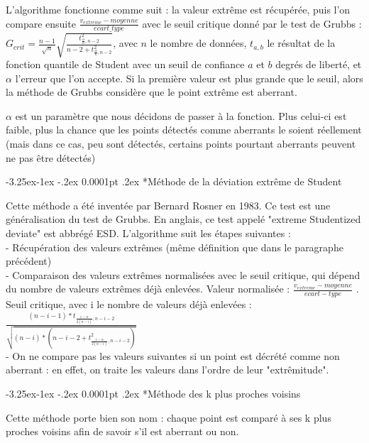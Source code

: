 \documentclass[a4paper,12pt]{article} %
\makeatletter
\renewcommand\subparagraph{\@startsection{subparagraph}{5}{\z@}%
                                      {-3.25ex\@plus -1ex \@minus -.2ex}%
                                      {0.0001pt \@plus .2ex}%
                                      {\normalfont\normalsize\bfseries}}
\makeatother
\begin{document}
                        L'algorithme fonctionne comme suit : la valeur extrême est récupérée, puis l'on compare ensuite $\frac{v_{extreme}-moyenne}{ecart\_type}$ avec le seuil critique donné par le test de Grubbs : $G_{crit} = \frac{n-1}{\sqrt{n}}\sqrt{\frac{t^2_{\frac{\alpha}{n},n-2}}{n-2+t^2_{\frac{\alpha}{n},n-2}}}$, avec $n$ le nombre de données, $t_{a,b}$ le résultat de la fonction quantile de Student avec un seuil de conﬁance $a$ et $b$ degrés de liberté, et $\alpha$ l’erreur que l’on accepte. Si la première valeur est plus grande que le seuil, alors la méthode de Grubbs considère que le point extrême est aberrant.
                        
                        $\alpha$ est un paramètre que nous décidons de passer à la fonction. Plus celui-ci est faible, plus la chance que les points détectés comme aberrants le soient réellement (mais dans ce cas, peu sont détectés, certains points pourtant aberrants peuvent ne pas être détectés)


					\subparagraph*{Méthode de la déviation extrême de Student}
					
                        Cette méthode a été inventée par Bernard Rosner en 1983. Ce test est une généralisation du test de Grubbs. En anglais, ce test appelé "extreme Studentized deviate" est abbrégé ESD. L’algorithme suit les étapes suivantes : \\
                        - Récupération des valeurs extrêmes (même déﬁnition que dans le paragraphe précédent)\\
                        - Comparaison des valeurs extrêmes normalisées avec le seuil critique, qui dépend du nombre de valeurs extrêmes déjà enlevées. Valeur normalisée : $\frac{v_{extreme}-moyenne}{ecart-type}$ . Seuil critique, avec i le nombre de valeurs déjà enlevées : 
                        $\frac{    (n-i-1)*t _{     \frac{1-\alpha}{2(n-i)},n-i-2     }       }  {        \sqrt{       (n-i)*(n-i-2+t^2_{   \frac{1-\alpha}{2(n-i)},n-i-2} )      }     }  $ \\
                         - On ne compare pas les valeurs suivantes si un point est décrété comme non aberrant : en eﬀet, on traite les valeurs dans l’ordre de leur "extrêmitude".

				
					\subparagraph*{Méthode des k plus proches voisins}
					
    					Cette méthode porte bien son nom : chaque point est comparé à ses k plus proches voisins afin de savoir s'il est aberrant ou non.\\
    					
\end{document}
